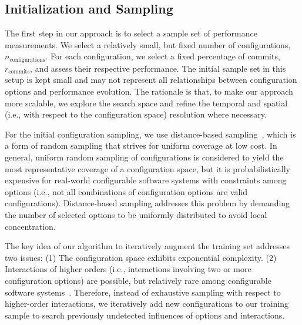 \documentclass[sigconf]{acmart}
\begin{document}
	\subsection{Initialization and Sampling}\label{sec:initialization}
	The first step in our approach is to select a sample set of performance measurements. 
	We select a relatively small, but fixed number of configurations, $n_\text{configurations}$. For each configuration, we select a fixed percentage of commits, $r_\text{commits}$, and assess their respective performance.
	The initial sample set in this setup is kept small and may not represent all relationships between configuration options and performance evolution. 
	The rationale is that, to make our approach more scalable, we explore the search space and refine the temporal and  spatial (i.e., with respect to the configuration space) resolution where necessary. 
	
	For the initial configuration sampling, we use distance-based  sampling~\cite{kaltenecker_distance-based_2019}, which is a form of random sampling that strives for uniform coverage at low cost. 
	In general, uniform random sampling of configurations is considered to yield the most representative coverage of a configuration space, but it is probabilistically expensive for real-world configurable software systems with constraints among options (i.e., not all combinations of configuration options are valid configurations). 
	Distance-based sampling addresses this problem by demanding the number of selected options to be uniformly distributed to avoid local concentration. 
	
	The key idea of our algorithm to iteratively augment the training set addresses two issues: (1) The configuration space exhibits exponential complexity. 
	(2) Interactions of higher orders (i.e., interactions involving two or more configuration options) are possible, but relatively rare among configurable software systems~\cite{kolesnikov_relation_2019,kolesnikov_tradeoffs_2019}. Therefore, instead of exhaustive sampling with respect to higher-order interactions, we iteratively add new configurations to our training sample to search previously undetected influences of options and interactions.
	
\end{document}

